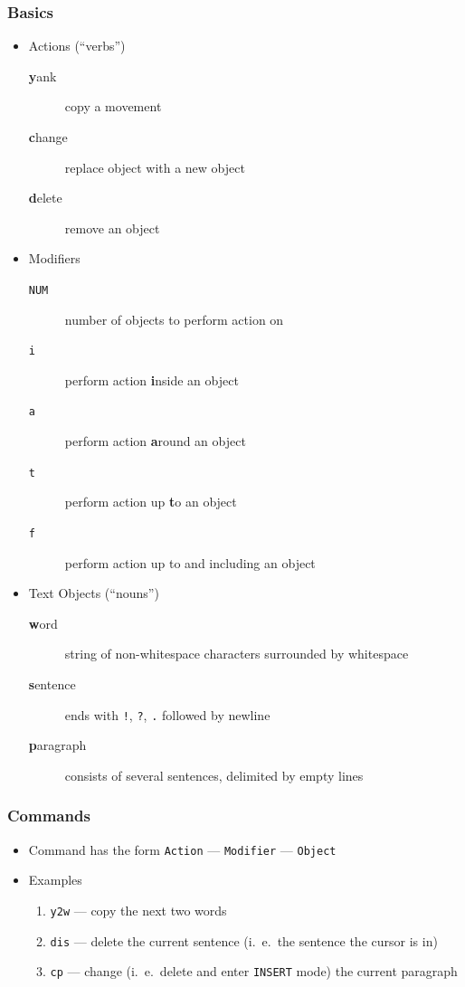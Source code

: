 \documentclass{beamer}
\begin{document}
\begin{frame}
    \frametitle{Basics}
    \begin{itemize}
        \item Actions (``verbs'')
            \begin{description}
                \item [\textbf{y}ank]   copy a movement
                \item [\textbf{c}hange] replace object with a new object
                \item [\textbf{d}elete] remove an object
            \end{description}
        \item Modifiers
            \begin{description}
                \item [\texttt{NUM}] number of objects to perform action on
                \item [\texttt{i}]   perform action \textbf{i}nside an object
                \item [\texttt{a}]   perform action \textbf{a}round an object
                \item [\texttt{t}]   perform action up \textbf{t}o an object
                \item [\texttt{f}]   perform action up to and including an object
            \end{description}
        \item Text Objects (``nouns'')
            \begin{description}
                \item [\textbf{w}ord]      string of non-whitespace characters surrounded by whitespace
                \item [\textbf{s}entence]  ends with \texttt{!}, \texttt{?}, \texttt{.} followed by newline
                \item [\textbf{p}aragraph] consists of several sentences, delimited by empty lines
            \end{description}
    \end{itemize}
\end{frame}
\begin{frame}
    \frametitle{Commands}
    \begin{itemize}
        \item Command has the form \texttt{Action} --- \texttt{Modifier} --- \texttt{Object}
        \item Examples
        \begin{enumerate}
            \item \texttt{y2w} --- copy the next two words
            \item \texttt{dis} --- delete the current sentence (i.\ e.\ the sentence the cursor is in)
            \item \texttt{cp}  --- change (i.\ e.\ delete and enter \texttt{INSERT} mode) the current paragraph
        \end{enumerate}
    \end{itemize}
\end{frame}
\end{document}
